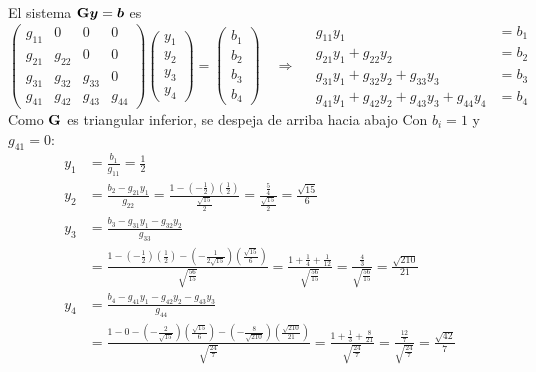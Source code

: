 El sistema $\mathbf{G}\bm{y} = \bm{b}$ es
\[
\begin{pmatrix}
	g_{11} & 0 & 0 & 0\\
	g_{21} & g_{22} & 0 & 0\\
	g_{31} & g_{32} & g_{33} & 0\\
	g_{41} & g_{42} & g_{43} & g_{44}
\end{pmatrix}
\begin{pmatrix} y_1\\ y_2\\ y_3\\ y_4 \end{pmatrix}
=
\begin{pmatrix} b_1\\ b_2\\ b_3\\ b_4 \end{pmatrix}
\quad\Longrightarrow\quad
\begin{aligned}
	g_{11}y_1 &= b_1\\
	g_{21}y_1 + g_{22}y_2 &= b_2\\
	g_{31}y_1 + g_{32}y_2 + g_{33}y_3 &= b_3\\
	g_{41}y_1 + g_{42}y_2 + g_{43}y_3 + g_{44}y_4 &= b_4
\end{aligned}
\]
Como $\mathbf{G}$ es triangular inferior, se despeja de arriba hacia abajo Con $b_i = 1$ y $g_{41} = 0$:
\begin{align*}
	y_1 &= \frac{b_1}{g_{11}} = \frac{1}{2}\\[8pt]
	y_2 &= \frac{b_2 - g_{21}y_1}{g_{22}}
	= \frac{1 - \left(-\tfrac12\right)\left(\tfrac12\right)}{\tfrac{\sqrt{15}}{2}}
	= \frac{\tfrac54}{\tfrac{\sqrt{15}}{2}} = \frac{\sqrt{15}}{6} \\[8pt]
	y_3 &= \frac{b_3 - g_{31}y_1 - g_{32}y_2}{g_{33}}\\
	&= \frac{1 - \left(-\tfrac12\right)\left(\tfrac12\right) - \left(-\tfrac{1}{2\sqrt{15}}\right)\left(\tfrac{\sqrt{15}}{6}\right)}{\sqrt{\tfrac{56}{15}}}
	= \frac{1 + \tfrac14 + \tfrac{1}{12}}{\sqrt{\tfrac{56}{15}}} = \frac{\tfrac43}{\sqrt{\tfrac{56}{15}}} = \frac{\sqrt{210}}{21} \\[8pt]
	y_4 &= \frac{b_4 - g_{41}y_1 - g_{42}y_2 - g_{43}y_3}{g_{44}}\\
	&= \frac{1 - 0 - \left(-\tfrac{2}{\sqrt{15}}\right)\left(\tfrac{\sqrt{15}}{6}\right) - \left(-\tfrac{8}{\sqrt{210}}\right)\left(\tfrac{\sqrt{210}}{21}\right)}{\sqrt{\tfrac{24}{7}}}
	= \frac{1 + \tfrac13 + \tfrac{8}{21}}{\sqrt{\tfrac{24}{7}}} = \frac{\tfrac{12}{7}}{\sqrt{\tfrac{24}{7}}} = \frac{\sqrt{42}}{7} 
\end{align*}

